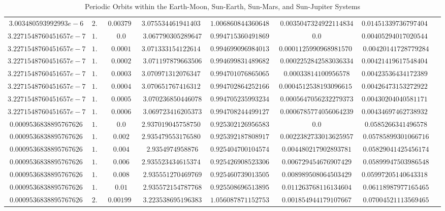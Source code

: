 \documentclass[conf]{new-aiaa}
\begin{document}
\begin{landscape}
\begin{table}
\begin{tabular}{cccccccc}
    $3.003480593992993e-6$ & $2.0$ & $0.003798$ & $3.0755344619414036$ & $1.0068608443606484$ & $0.0035047324922114834$ & $0.014513397367974044$\\
    $3.2271548760451657e-7$ & $1.0$ & $0.0$ & $3.067790305289647$ & $0.9947153604918691$ & $0.0$ & $0.004052940170205446$\\
    $3.2271548760451657e-7$ & $1.0$ & $0.0001$ & $3.0713331541226148$ & $0.9946990969840135$ & $0.00011259909689815706$ & $0.00420141728779284$\\
    $3.2271548760451657e-7$ & $1.0$ & $0.0002$ & $3.071197879663506$ & $0.9946998314896827$ & $0.0002252842583036334$ & $0.004214196175484041$\\
    $3.2271548760451657e-7$ & $1.0$ & $0.0003$ & $3.0709713120763475$ & $0.9947010768650656$ & $0.00033814100956578$ & $0.004235364341723893$\\
    $3.2271548760451657e-7$ & $1.0$ & $0.0004$ & $3.0706517674163125$ & $0.9947028642521663$ & $0.00045125381930966155$ & $0.004264731532729223$\\
    $3.2271548760451657e-7$ & $1.0$ & $0.0005$ & $3.070236850446078$ & $0.9947052359932343$ & $0.0005647056232279373$ & $0.004302040405811711$\\
    $3.2271548760451657e-7$ & $1.0$ & $0.0006$ & $3.069723416205373$ & $0.9947082444991275$ & $0.0006785774056064239$ & $0.004346974627389325$\\    
    $0.0009536838895767626$ & $1.0$ & $0.0$ & $2.9370190457587504$ & $0.9253021269565835$ & $0.0$ & $0.0585266341496578$\\
    $0.0009536838895767626$ & $1.0$ & $0.002$ & $2.9354795531765805$ & $0.9253921878089174$ & $0.0022382733013625957$ & $0.05785899301066716$\\
    $0.0009536838895767626$ & $1.0$ & $0.004$ & $2.9354974958876$ & $0.9254047001045744$ & $0.004480217902893781$ & $0.05829041425456174$\\
    $0.0009536838895767626$ & $1.0$ & $0.006$ & $2.9355234346153742$ & $0.9254269085233069$ & $0.006729454676907429$ & $0.05899947503986548$\\
    $0.0009536838895767626$ & $1.0$ & $0.008$ & $2.935551270469769$ & $0.9254607390135051$ & $0.008989508064503429$ & $0.059972051406433184$\\
    $0.0009536838895767626$ & $1.0$ & $0.01$ & $2.935572154787768$ & $0.9255086965138954$ & $0.011263768116134604$ & $0.06118987977165465$\\
    $0.0009536838895767626$ & $2.0$ & $0.001999$ & $3.223538695196383$ & $1.0560878711527533$ & $0.001854944179107667$ & $0.07004521113569465$\\    
\end{tabular}
\caption{Periodic Orbits within the Earth-Moon, Sun-Earth, Sun-Mars, and Sun-Jupiter Systems}
\end{table}
\end{landscape}
\end{document}
